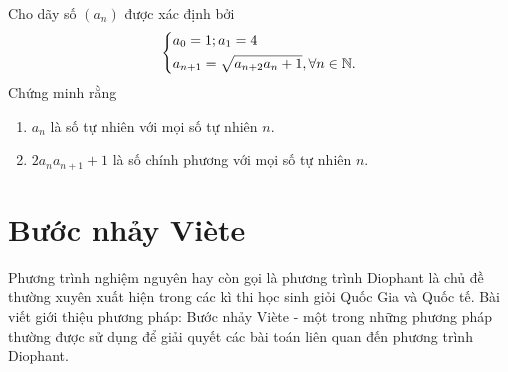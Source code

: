\begin{bt}%
	Cho dãy số $(a_n)$ được xác định bởi
	$$\left\{\begin{aligned}&a_0=1; a_1=4\\&a_{n+1}=\sqrt{a_{n+2}a_n+1}, \forall n\in\mathbb{N}.\end{aligned}\right.$$
	Chứng minh rằng
	\begin{enumerate}
		\item $a_n$ là số tự nhiên với mọi số tự nhiên $n$.
		\item $2a_na_{n+1}+1$ là số chính phương với mọi số tự nhiên $n$.
	\end{enumerate}
\end{bt}


\section{Bước nhảy Viète}
\begin{center}
	\textbf{\color{violet}{Hà Tuấn Dũng\\
			(Khoa Toán, ĐHSP Hà Nội 2)}}
\end{center}
Phương trình nghiệm nguyên hay còn gọi là phương trình Diophant là chủ đề thường xuyên xuất hiện trong các kì thi học sinh giỏi Quốc Gia và Quốc tế. Bài viết giới thiệu phương pháp: Bước nhảy Viète - một trong những phương pháp thường được sử dụng để giải quyết các bài toán liên quan đến phương trình Diophant.
